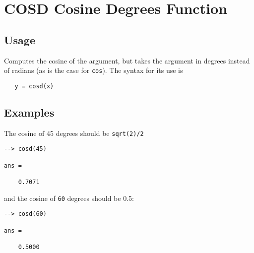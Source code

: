 \section{COSD Cosine Degrees Function}

\subsection{Usage}

Computes the cosine of the argument, but takes
the argument in degrees instead of radians (as is the case
for \verb|cos|). The syntax for its use is
\begin{verbatim}
   y = cosd(x)
\end{verbatim}
\subsection{Examples}

The cosine of 45 degrees should be \verb|sqrt(2)/2|
\begin{verbatim}
--> cosd(45)

ans = 

    0.7071 
\end{verbatim}
and the cosine of \verb|60| degrees should be 0.5:
\begin{verbatim}
--> cosd(60)

ans = 

    0.5000 
\end{verbatim}

